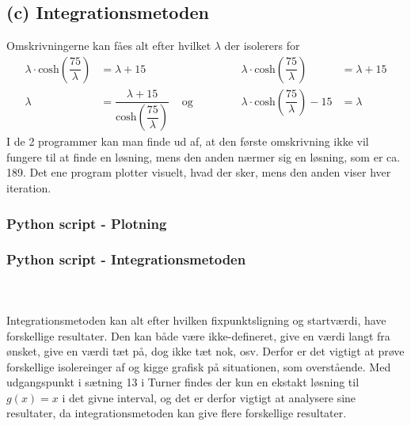 \subsection*{(c) Integrationsmetoden}
Omskrivningerne kan fåes alt efter hvilket $\lambda$ der isolerers for
$$
\begin{array}{rlcrl}
\lambda \cdot \text{cosh}(\dfrac{75}{\lambda})&=\lambda+15 & \phantom{matematik} & \lambda \cdot \text{cosh}(\dfrac{75}{\lambda})&=\lambda+15\\
\lambda &=\dfrac{\lambda+15}{\text{cosh}(\dfrac{75}{\lambda})} & \text{ og } & \lambda \cdot \text{cosh}(\dfrac{75}{\lambda})-15 &=\lambda
\end{array}
$$ 
%
%
I de 2 programmer kan man finde ud af, at den første omskrivning ikke vil fungere til at finde en løsning, mens den anden nærmer sig en løsning, som er ca. 189. Det ene program plotter visuelt, hvad der sker, mens den anden viser hver iteration.
% 
%
\subsubsection*{Python script - Plotning}
%
\lstset{style=mystyle}

%
\subsubsection*{Python script - Integrationsmetoden}
%
\lstset{style=mystyle}

%
\phantom{matematik}\\\\
Integrationsmetoden kan alt efter hvilken fixpunktsligning og startværdi, have forskellige resultater. 
Den kan både være ikke-defineret, give en værdi langt fra ønsket, give en værdi tæt på, dog ikke tæt nok, osv. 
Derfor er det vigtigt at prøve forskellige isolereinger af og kigge grafisk på situationen, som overstående. 
Med udgangspunkt i sætning 13 i Turner findes der kun en ekstakt løsning til $g(x)=x$ i det givne interval, og det er derfor vigtigt at analysere sine resultater, da integrationsmetoden kan give flere forskellige resultater.
\\
% 